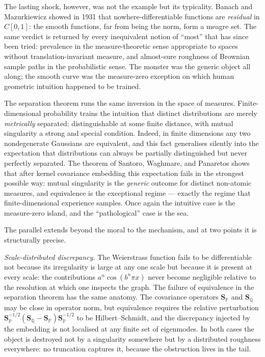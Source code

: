 \documentclass[12pt, oneside]{book}
\theoremstyle{plain}
\theoremstyle{definition}
\newcommand{\PP}{\mathbb{P}}
\newcommand{\QQ}{\mathbb{Q}}
\newcommand{\SP}{\mathbf{S}_{\PP}}
\newcommand{\SQ}{\mathbf{S}_{\QQ}}
\begin{document}
The lasting shock, however, was not the example but its typicality.
Banach and Mazurkiewicz showed in 1931 that nowhere-differentiable
functions are \emph{residual} in $C[0,1]$: the smooth functions, far
from being the norm, form a meagre set. The same verdict is returned
by every inequivalent notion of ``most'' that has since been tried:
prevalence in the measure-theoretic sense appropriate to spaces
without translation-invariant measure, and almost-sure roughness of
Brownian sample paths in the probabilistic sense. The monster was the
generic object all along; the smooth curve was the measure-zero
exception on which human geometric intuition happened to be trained.

The separation theorem runs the same inversion in the space of
measures. Finite-dimensional probability trains the intuition that
distinct distributions are merely \emph{metrically} separated:
distinguishable at some finite distance, with mutual singularity a
strong and special condition. Indeed, in finite dimensions any two
nondegenerate Gaussians are equivalent, and this fact generalises
silently into the expectation that distributions can always be
partially distinguished but never perfectly separated. The theorem of
Santoro, Waghmare, and Panaretos shows that after kernel covariance
embedding this expectation fails in the strongest possible way:
mutual singularity is the \emph{generic} outcome for distinct
non-atomic measures, and equivalence is the exceptional regime ---
exactly the regime that finite-dimensional experience samples. Once
again the intuitive case is the measure-zero island, and the
``pathological'' case is the sea.

The parallel extends beyond the moral to the mechanism, and at two
points it is structurally precise.

\emph{Scale-distributed discrepancy.} The Weierstrass function fails
to be differentiable not because its irregularity is large at any one
scale but because it is present at every scale: the contributions
$a^n \cos(b^n \pi x)$ never become negligible relative to the
resolution at which one inspects the graph. The failure of
equivalence in the separation theorem has the same anatomy. The
covariance operators $\SP$ and $\SQ$ may be close in operator norm,
but equivalence requires the relative perturbation
$\SP^{-1/2}(\SQ - \SP)\SP^{-1/2}$
to be Hilbert--Schmidt, and the discrepancy injected by the embedding
is not localised at any finite set of eigenmodes. In both cases the
object is destroyed not by a singularity somewhere but by a
distributed roughness everywhere: no truncation captures it, because
the obstruction lives in the tail.
\end{document}
